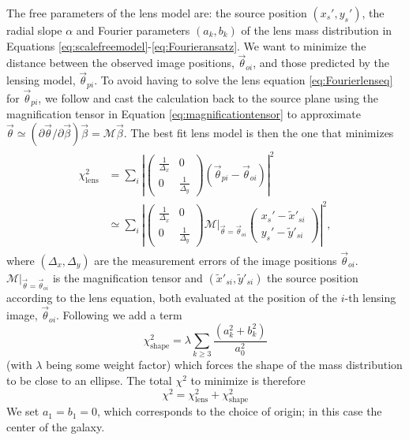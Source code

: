 \documentclass[useAMS,usenatbib]{mnras}
\newcommand{\vect}[1]{\vec{#1}} %
\begin{document}
The free parameters of the lens model are: the source position $(x_s',y_s')$, the radial slope $\alpha$ and Fourier parameters $(a_k,b_k)$ of the lens mass distribution in Equations \eqref{eq:scalefreemodel}-\eqref{eq:Fourieransatz}. We want to minimize the distance between the observed image positions, $\vect{\theta}_{oi}$, and those predicted by the lensing model, $\vect{\theta}_{pi}$. To avoid having to solve the lens equation \eqref{eq:Fourierlenseq} for $\vect{\theta}_{pi}$, we follow \citet{1991ApJ...373..354K} and cast the calculation back to the source plane using the magnification tensor in Equation \eqref{eq:magnificationtensor} to approximate $\vect{\theta} \simeq (\partial \vect{\theta} / \partial \vect{\beta}) \vect{\beta} = \mathscr{M} \vect{\beta} $. The best fit lens model is then the one that minimizes
\begin{align}
\begin{split}
\chi^2_\text{lens} &= \sum_{i} \left|\left( \begin{matrix} \frac{1}{\Delta_x} & 0\\0 & \frac{1}{\Delta_y}\end{matrix}\right) \left( \vect{\theta}_{pi} - \vect{\theta}_{oi} \right)\right|^2\label{eq:chi2lens}\\
&\simeq \sum_{i} \left|\left( \begin{matrix} \frac{1}{\Delta_x} & 0\\0 & \frac{1}{\Delta_y}\end{matrix}\right)  \left.\mathscr{M}\right|_{\vect{\theta}=\vect{\theta}_{oi}} \left( \begin{matrix} x_s' - \tilde{x}'_{si} \\ y_s' - \tilde{y}'_{si} \end{matrix} \right) \right|^2,
\end{split}
\end{align}
where $(\Delta_x,\Delta_y)$ are the measurement errors of the image positions $\vect{\theta}_{oi}$. $\left.\mathscr{M}\right|_{\vect{\theta}=\vect{\theta}_{oi}}$ is the magnification tensor and $(\tilde{x}'_{si},\tilde{y}'_{si})$ the source position according to the lens equation, both evaluated at the position of the $i$-th lensing image, $\vect{\theta}_{oi}$. Following \citet{GlennEC} we add a term
\begin{equation}
\chi^2_\text{shape} = \lambda \sum_{k \geq 3} \frac{\left(a_k^2 +b_k^2 \right)}{a_0^2} \label{eq:chi2shape}
\end{equation}
(with $\lambda$ being some weight factor) which forces the shape of the mass distribution to be close to an ellipse. The total $\chi^2$ to minimize is therefore
\begin{equation}
\chi^2 = \chi^2_\text{lens} + \chi^2_\text{shape} \label{eq:chi2total}
\end{equation}
We set $a_1 = b_1 = 0$, which corresponds to the choice of origin; in this case the center of the galaxy.
\end{document}

